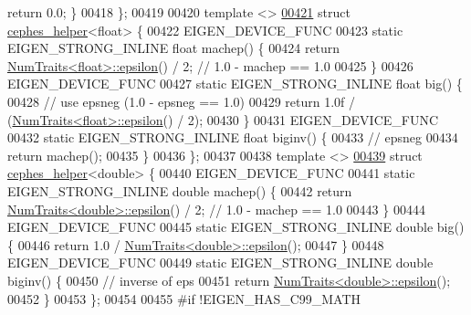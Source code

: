 \begin{DoxyCode}
{      return} 0.0; \}
00418 \};
00419 
00420 \textcolor{keyword}{template} <>
\hyperlink{struct_eigen_1_1internal_1_1cephes__helper_3_01float_01_4}{00421} \textcolor{keyword}{struct }\hyperlink{struct_eigen_1_1internal_1_1cephes__helper}{cephes\_helper}<float> \{
00422   EIGEN\_DEVICE\_FUNC
00423   \textcolor{keyword}{static} EIGEN\_STRONG\_INLINE \textcolor{keywordtype}{float} machep() \{
00424     \textcolor{keywordflow}{return} \hyperlink{group___core___module_struct_eigen_1_1_num_traits}{NumTraits<float>::epsilon}() / 2;  \textcolor{comment}{// 1.0 - machep == 1.0}
00425   \}
00426   EIGEN\_DEVICE\_FUNC
00427   \textcolor{keyword}{static} EIGEN\_STRONG\_INLINE \textcolor{keywordtype}{float} big() \{
00428     \textcolor{comment}{// use epsneg (1.0 - epsneg == 1.0)}
00429     \textcolor{keywordflow}{return} 1.0f / (\hyperlink{group___core___module_struct_eigen_1_1_num_traits}{NumTraits<float>::epsilon}() / 2);
00430   \}
00431   EIGEN\_DEVICE\_FUNC
00432   \textcolor{keyword}{static} EIGEN\_STRONG\_INLINE \textcolor{keywordtype}{float} biginv() \{
00433     \textcolor{comment}{// epsneg}
00434     \textcolor{keywordflow}{return} machep();
00435   \}
00436 \};
00437 
00438 \textcolor{keyword}{template} <>
\hyperlink{struct_eigen_1_1internal_1_1cephes__helper_3_01double_01_4}{00439} \textcolor{keyword}{struct }\hyperlink{struct_eigen_1_1internal_1_1cephes__helper}{cephes\_helper}<double> \{
00440   EIGEN\_DEVICE\_FUNC
00441   \textcolor{keyword}{static} EIGEN\_STRONG\_INLINE \textcolor{keywordtype}{double} machep() \{
00442     \textcolor{keywordflow}{return} \hyperlink{group___core___module_struct_eigen_1_1_num_traits}{NumTraits<double>::epsilon}() / 2;  \textcolor{comment}{// 1.0 - machep == 1.0}
00443   \}
00444   EIGEN\_DEVICE\_FUNC
00445   \textcolor{keyword}{static} EIGEN\_STRONG\_INLINE \textcolor{keywordtype}{double} big() \{
00446     \textcolor{keywordflow}{return} 1.0 / \hyperlink{group___core___module_struct_eigen_1_1_num_traits}{NumTraits<double>::epsilon}();
00447   \}
00448   EIGEN\_DEVICE\_FUNC
00449   \textcolor{keyword}{static} EIGEN\_STRONG\_INLINE \textcolor{keywordtype}{double} biginv() \{
00450     \textcolor{comment}{// inverse of eps}
00451     \textcolor{keywordflow}{return} \hyperlink{group___core___module_struct_eigen_1_1_num_traits}{NumTraits<double>::epsilon}();
00452   \}
00453 \};
00454 
00455 \textcolor{preprocessor}{#if !EIGEN\_HAS\_C99\_MATH}

\end{DoxyCode}
